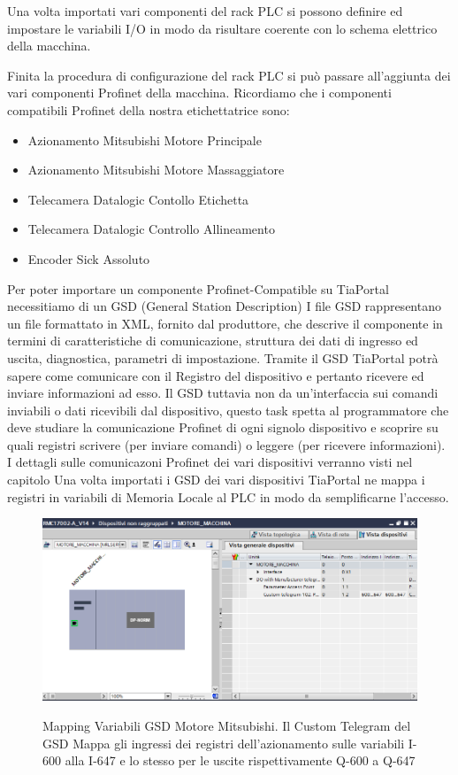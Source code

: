 \documentclass[12pt, a4paper, oneside]{book}
\begin{document}
	Una volta importati vari componenti del rack PLC si possono definire ed impostare le variabili I/O in modo da risultare coerente con lo schema elettrico della macchina.
	
	Finita la procedura di configurazione del rack PLC si può passare all'aggiunta dei vari componenti Profinet della macchina. 
	Ricordiamo che i componenti compatibili Profinet della nostra etichettatrice sono:
	\begin{itemize}
		\item Azionamento Mitsubishi Motore Principale
		\item Azionamento Mitsubishi Motore Massaggiatore
		\item Telecamera Datalogic Contollo Etichetta
		\item Telecamera Datalogic Controllo Allineamento
		\item Encoder Sick Assoluto
	\end{itemize}

	Per poter importare un componente Profinet-Compatible su TiaPortal necessitiamo di un GSD (General Station Description) 
	I file GSD rappresentano un file formattato in XML, fornito dal produttore, che descrive il componente in termini di caratteristiche di comunicazione, struttura dei dati di ingresso ed uscita, diagnostica, parametri di impostazione. Tramite il GSD TiaPortal potrà sapere come comunicare con il Registro del dispositivo e pertanto ricevere ed inviare informazioni ad esso. Il GSD tuttavia non da un'interfaccia sui comandi inviabili o dati ricevibili dal dispositivo, questo task spetta al programmatore che deve studiare la comunicazione Profinet di ogni signolo dispositivo e scoprire su quali registri scrivere (per inviare comandi) o leggere (per ricevere informazioni). I dettagli sulle comunicazoni Profinet dei vari dispositivi verranno visti nel capitolo \cite{profinet}
	Una volta importati i GSD dei vari dispositivi TiaPortal ne mappa i registri in variabili di Memoria Locale al PLC in modo da semplificarne l'accesso. 
	

	\begin{figure}[H]
		\centering
		\includegraphics[width=12cm]{Immagini/TIA1}
		\label{tia1}
		\caption{Mapping Variabili GSD Motore Mitsubishi. Il Custom Telegram del GSD Mappa gli ingressi dei registri dell'azionamento sulle variabili I-600 alla I-647 e lo stesso per le uscite rispettivamente Q-600 a Q-647}
	\end{figure}
\end{document}
